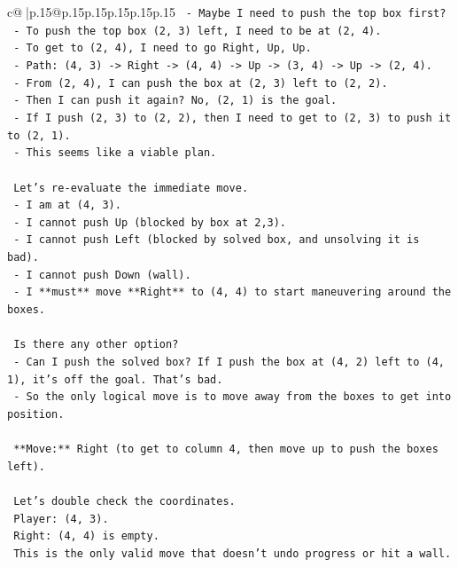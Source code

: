 \documentclass{article}
\begin{document}
{\begin{supertabular}{c@{$\;$}|p{.15\linewidth}@{}p{.15\linewidth}p{.15\linewidth}p{.15\linewidth}p{.15\linewidth}p{.15\linewidth}}
{{{\texttt{    {-} Maybe I need to push the top box first?} \\
\texttt{    {-} To push the top box (2, 3) left, I need to be at (2, 4).} \\
\texttt{    {-} To get to (2, 4), I need to go Right, Up, Up.} \\
\texttt{    {-} Path: (4, 3) {-}> Right {-}> (4, 4) {-}> Up {-}> (3, 4) {-}> Up {-}> (2, 4).} \\
\texttt{    {-} From (2, 4), I can push the box at (2, 3) left to (2, 2).} \\
\texttt{    {-} Then I can push it again? No, (2, 1) is the goal.} \\
\texttt{    {-} If I push (2, 3) to (2, 2), then I need to get to (2, 3) to push it to (2, 1).} \\
\texttt{    {-} This seems like a viable plan.} \\
\\ 
\texttt{    Let's re{-}evaluate the immediate move.} \\
\texttt{    {-} I am at (4, 3).} \\
\texttt{    {-} I cannot push Up (blocked by box at 2,3).} \\
\texttt{    {-} I cannot push Left (blocked by solved box, and unsolving it is bad).} \\
\texttt{    {-} I cannot push Down (wall).} \\
\texttt{    {-} I **must** move **Right** to (4, 4) to start maneuvering around the boxes.} \\
\\ 
\texttt{    Is there any other option?} \\
\texttt{    {-} Can I push the solved box? If I push the box at (4, 2) left to (4, 1), it's off the goal. That's bad.} \\
\texttt{    {-} So the only logical move is to move away from the boxes to get into position.} \\
\\ 
\texttt{    **Move:** Right (to get to column 4, then move up to push the boxes left).} \\
\\ 
\texttt{    Let's double check the coordinates.} \\
\texttt{    Player: (4, 3).} \\
\texttt{    Right: (4, 4) is empty.} \\
\texttt{    This is the only valid move that doesn't undo progress or hit a wall.} \\
}}}
\end{supertabular}}
\end{document}
